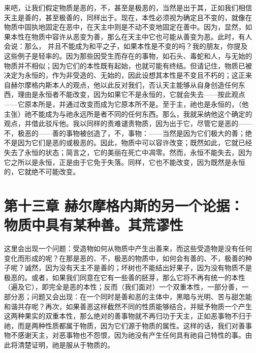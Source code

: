 来吧，让我们假定物质是恶的，不，甚至是极恶的，当然是出于其，正如我们相信天主是善的，甚至极善的，同样出于。现在，本性必须视为确定且不变的，就像在物质中固执地固定在恶中，在天主中则是不动不变地固定在善中。因为，显然，如果本性在物质中容许从恶变为善，那么在天主中它也可能从善变为恶。此时，有人会说：那么， 并且不能成为和平之子，如果本性是不变的吗？我的朋友，你提及这些例子是轻率的。因为那些因受生而存在的事物，如石头、毒蛇和人，与无始的物质并不相似；因为它们的本性既有起始，也就可能有终结。但请记住，物质已被决定为永恒的，作为非受造的、无始的，因此设想其本性是不变且不朽的；这正来自赫尔摩格内斯本人的观点，他以此反对我们，否认天主能够从自身创造任何东西，理由是永恒者不能改变，因为如果它不是永恒的，它就会失去——按此观点——它原本所是，并通过改变而成为它原本所不是。至于主，祂也是永恒的，（他主张）祂不能成为与祂永远所是者不同的任何东西。那么，我就采纳他这个确定的观点，并借此驳斥他。我以同样的责难谴责物质，因为出于它，尽管它是恶的——不，极恶的——善的事物被创造了，不，事物：——当然是因为它们极大的善；绝不是因为它们是恶的或极恶的。因此，物质中可以容许改变；既然如此，它就已经失去了永恒的状态；简言之，它的美丽在死亡中凋零。然而，永恒不能失去，因为它之所以是永恒，正是由于它免于失落。同样，它也不能改变，因为既然是永恒的，它就绝不可能改变。\par


\section{第十三章 赫尔摩格内斯的另一个论据：物质中具有某种善。其荒谬性}

这里会出现一个问题：受造物如何从物质中产生出善来，而这些受造物是没有任何变化而形成的呢？在那是恶的、不，极恶的物质中，如何会有善的、不，极善的种子呢？诚然，因为没有天主不是善的；坏树也不能结出好果子，因为没有物质不是极恶的。或者，如果我们同意在它有一些善的胚芽，那么它将不再有统一的本性（遍及它），即完全是恶的本性；反而（我们面对）一个双重本性，一部分善，一部分恶；问题又会出现：在一个同时是善和恶的主体中，黑暗与光明、苦与甜怎能和谐共存呢？再次，如果善恶这样截然不同的性质能够结合，并赋予物质一个产生这两种果实的双重本性，那么绝对的善事物就不再归功于天主，正如恶事物不归于祂，而是两种性质都属于物质，因为它们源于物质的属性。这样的话，我们对善事物不感谢天主，对恶事物也不怨恨，因为祂没有产生任何具有祂自己特性的事。由此将清楚证明，祂是服从于物质的。\par

